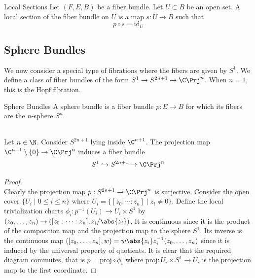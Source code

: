 \documentclass[a4paper]{article}
\begin{document}
\begin{defn}{Local Sections}{} Let $(F,E,B)$ be a fiber bundle. Let $U\subset B$ be an open set. A local section of the fiber bundle on $U$ is a map $s:U\to B$ such that $$p\circ s=\text{id}_U$$
\end{defn}

\subsection{Sphere Bundles}
We now consider a special type of fibrations where the fibers are given by $S^1$. We define a class of fiber bundles of the form $S^1\to S^{2n+1}\to\C\Prj^n$. When $n=1$, this is the Hopf fibration. 

\begin{defn}{Sphere Bundles}{} A sphere bundle is a fiber bundle $p:E\to B$ for which its fibers are the $n$-sphere $S^n$. 
\end{defn}

\begin{eg}{}{}\\
Let $n\in\N$. Consider $S^{2n+1}$ lying inside $\C^{n+1}$. The projection map $\C^{n+1}\setminus\{0\}\to\C\Prj^n$ induces a fiber bundle $$S^1\hookrightarrow S^{2n+1}\to\C\Prj^n$$
\begin{proof}\\
Clearly the projection map $p:S^{2n+1}\to\C\Prj^n$ is surjective. Consider the open cover $\{U_i\;|\;0\leq i\leq n\}$ where $U_i=\{[z_0:\cdots:z_n]\;|\;z_i\neq 0\}$. Define the local trivialization charts $\phi_i:p^{-1}(U_i)\to U_i\times S^1$ by $(z_0,\dots,z_n)\to([z_0:\cdots:z_n],z_i/\abs{z_i})$. It is continuous since it is the product of the composition map and the projection map to the sphere $S^1$. Its inverse is the continuous map $([z_0,\dots,z_n],w)=w\abs{z_i}z_i^{-1}(z_0,\dots,z_n)$ since it is induced by the universal property of quotients. It is clear that the required diagram commutes, that is $p=\text{proj}\circ\phi_i$ where $\text{proj}:U_i\times S^1\to U_i$ is the projection map to the first coordinate. 
\end{proof}
\end{eg}
\end{document}
